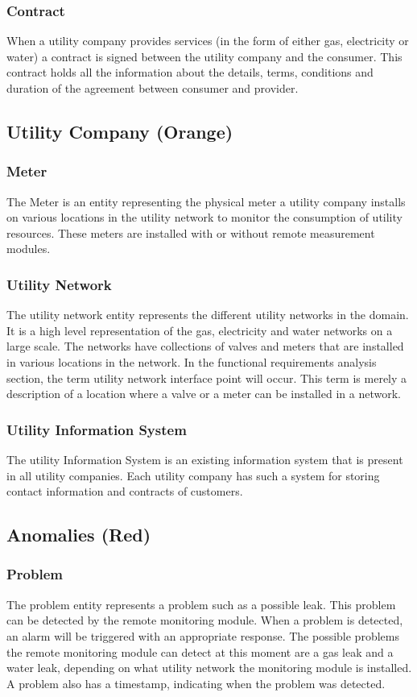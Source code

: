 \subsubsection{Contract}
When a utility company provides services (in the form of either gas, electricity or water) a contract is signed between the utility company and the consumer. 
This contract holds all the information about the details, terms, conditions and duration of the agreement between consumer and provider. 
\subsection{Utility Company (Orange)}
\subsubsection{Meter}
The Meter is an entity representing the physical meter a utility company installs on various locations in the utility network to monitor the consumption of utility resources. These meters are installed with or without remote measurement modules. 
\subsubsection{Utility Network}
The utility network entity represents the different utility networks in the domain. It is a high level representation of 
the gas, electricity and water networks on a large scale. The networks have collections of valves and meters that are installed in various locations in the network. 
In the functional requirements analysis section, the term utility network interface point will occur. This term is merely a description of a location 
where a valve or a meter can be installed in a network.
\subsubsection{Utility Information System}
The utility Information System is an existing information system that is present in all utility companies. Each utility company has such a system for storing contact information and contracts of customers. 
\subsection{Anomalies (Red)}
\subsubsection{Problem}
The problem entity represents a problem such as a possible leak. This problem can be detected by the remote monitoring module. When a problem is detected,
an alarm will be triggered with an appropriate response. The possible problems the remote monitoring module can detect at this moment are a gas leak and a water leak,
depending on what utility network the monitoring module is installed. A problem also has a timestamp, indicating when the problem was detected.
